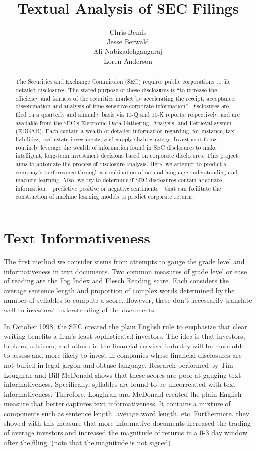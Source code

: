\documentclass[12pt]{article}
\title{Textual Analysis of SEC Filings}
\author{Chris Bemis \\ Jesse Berwald \\ Ali Nabizadehgangaraj \\ Loren Anderson}
\begin{document}
\maketitle


\begin{abstract}
The Securities and Exchange Commission (SEC) requires public corporations to file detailed disclosures. The stated purpose of these disclosures is ``to increase the efficiency and fairness of the securities market by accelerating the receipt, acceptance, dissemination and analysis of time-sensitive corporate information''. Disclosures are filed on a quarterly and annually basis via 10-Q and 10-K reports, respectively, and are available from the SEC's Electronic Data Gathering, Analysis, and Retrieval system (EDGAR). Each contain a wealth of detailed information regarding, for instance, tax liabilities, real estate investments, and supply chain strategy. Investment firms routinely leverage the wealth of information found in SEC disclosures to make intelligent, long-term investment decisions based on corporate disclosures. This project aims to automate the process of disclosure analysis. Here, we attempt to predict a company's performance through a combination of natural language understanding and machine learning. Also, we try to determine if SEC disclosures contain adequate information -- predictive positive or negative sentiments -- that can facilitate the construction of machine learning models to predict corporate returns.
\end{abstract}


\section{Text Informativeness}

The first method we consider stems from attempts to gauge the grade level and informativeness in text documents. Two common measures of grade level or ease of reading are the Fog Index and Flesch Reading score. Each considers the average sentence length and proportion of complex words determined by the number of syllables to compute a score. However, these don’t necessarily translate well to investors’ understanding of the documents.

In October 1998, the SEC created the plain English rule to emphasize that clear writing benefits a firm’s least sophisticated investors. The idea is that investors, brokers, advisers, and others in the financial services industry will be more able to assess and more likely to invest in companies whose financial disclosures are not buried in legal jargon and obtuse language. Research performed by Tim Loughran and Bill McDonald shows that these scores are poor at gauging text informativeness. Specifically, syllables are found to be uncorrelated with text informativeness. Therefore, Loughran and McDonald created the plain English measure that better captures text informativeness. It contains a mixture of components such as sentence length, average word length, etc. Furthermore, they showed with this measure that more informative documents increased the trading of average investors and increased the magnitude of returns in a 0-3 day window after the filing. (note that the magnitude is not signed)
\end{document}
